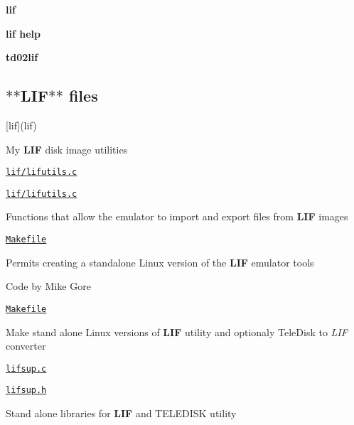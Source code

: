 \begin{DoxyItemize}
\item {\bfseries lif}
\item {\bfseries lif help}
\item {\bfseries td02lif}
\end{DoxyItemize}





\subsection*{$\ast$$\ast$\+L\+I\+F$\ast$$\ast$ files}


\begin{DoxyItemize}
\item \mbox{[}lif\mbox{]}(lif)
\begin{DoxyItemize}
\item My {\bfseries L\+IF} disk image utilities
\item \href{lif/lifutils.c}{\tt lif/lifutils.\+c}
\item \href{lif/lifutils.c}{\tt lif/lifutils.\+c}
\begin{DoxyItemize}
\item Functions that allow the emulator to import and export files from {\bfseries L\+IF} images
\end{DoxyItemize}
\item \href{lif/Makefile}{\tt Makefile}
\begin{DoxyItemize}
\item Permits creating a standalone Linux version of the {\bfseries L\+IF} emulator tools
\end{DoxyItemize}
\item Code by Mike Gore
\begin{DoxyItemize}
\item \href{lif/Makefile}{\tt Makefile}
\begin{DoxyItemize}
\item Make stand alone Linux versions of {\bfseries L\+IF} utility and optionaly Tele\+Disk to {\itshape L\+IF} converter
\end{DoxyItemize}
\item \href{lif/lifsup.c}{\tt lifsup.\+c}
\item \href{lif/lifsup.h}{\tt lifsup.\+h}
\begin{DoxyItemize}
\item Stand alone libraries for {\bfseries L\+IF} and T\+E\+L\+E\+D\+I\+SK utility
\begin{DoxyItemize}

\end{DoxyItemize}
\end{DoxyItemize}
\end{DoxyItemize}
\end{DoxyItemize}
\end{DoxyItemize}
